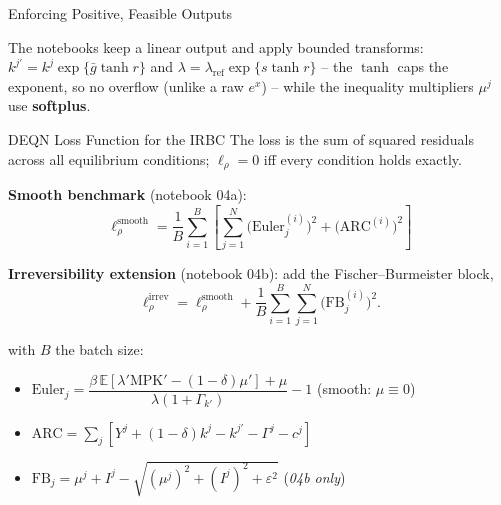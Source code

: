 \documentclass[aspectratio=169,11pt]{beamer}
\newcommand{\emphc}[1]{\textcolor{harvardcrimson}{#1}}
\newcommand{\E}[1]{\mathbb{E}\!\left[#1\right]}
\begin{document}
\begin{frame}{Enforcing Positive, Feasible Outputs}
\begin{center}
\end{center}

\vspace{0.2em}
{\small
The notebooks keep a \emphc{linear} output and apply bounded transforms: $k^{j\prime}=k^j\exp\{\bar g\tanh r\}$ and $\lambda=\lambda_{\text{ref}}\exp\{s\tanh r\}$ -- the $\tanh$ caps the exponent, so no overflow (unlike a raw $e^x$) -- while the inequality multipliers $\mu^j$ use \textbf{softplus}.
}
\end{frame}

\begin{frame}{DEQN Loss Function for the IRBC}
\footnotesize
The loss is the \emphc{sum of squared residuals} across all equilibrium conditions; $\ell_\rho = 0$ iff every condition holds exactly.

\vspace{0.15em}
\textbf{Smooth benchmark} (notebook 04a):
\[
\boxed{
\ell^{\mathrm{smooth}}_\rho = \frac{1}{B}\sum_{i=1}^{B} \left[\sum_{j=1}^{N} \bigl(\text{Euler}_j^{(i)}\bigr)^2 + \bigl(\text{ARC}^{(i)}\bigr)^2\right]
}
\]

\vspace{0.1em}
\textbf{Irreversibility extension} (notebook 04b): add the Fischer--Burmeister block,
\[
\ell^{\mathrm{irrev}}_\rho = \ell^{\mathrm{smooth}}_\rho + \frac{1}{B}\sum_{i=1}^{B}\sum_{j=1}^{N}\bigl(\text{FB}_j^{(i)}\bigr)^2.
\]

\vspace{0.1em}
with $B$ the batch size:
\begin{itemize}\itemsep0pt
    \item $\text{Euler}_j = \dfrac{\beta\,\E{\lambda' \text{MPK}' - (1-\delta)\mu'} + \mu}{\lambda(1+\Gamma_{k'})} - 1$ \quad (smooth: $\mu \equiv 0$)
    \item $\text{ARC} = \sum_j [Y^j + (1-\delta)k^j - k^{j\prime} - \Gamma^j - c^j]$
    \item $\text{FB}_j = \mu^j + I^j - \sqrt{(\mu^j)^2 + (I^j)^2 + \varepsilon^2}$ \quad (\emph{04b only})
\end{itemize}
\end{frame}
\end{document}

